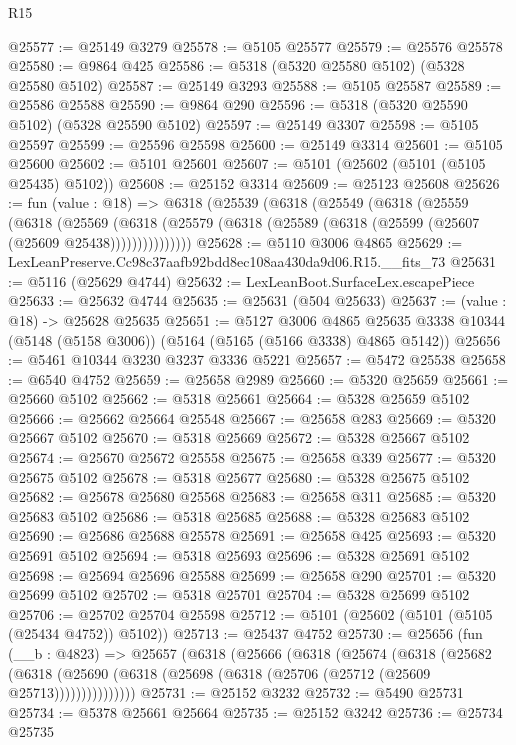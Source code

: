 \begin{lexlean}{R15}
\begin{coremodule}
{{{{{{{{{{{@25577 := @25149 @3279
@25578 := @5105 @25577
@25579 := @25576 @25578
@25580 := @9864 @425
@25586 := @5318 (@5320 @25580 @5102) (@5328 @25580 @5102)
@25587 := @25149 @3293
@25588 := @5105 @25587
@25589 := @25586 @25588
@25590 := @9864 @290
@25596 := @5318 (@5320 @25590 @5102) (@5328 @25590 @5102)
@25597 := @25149 @3307
@25598 := @5105 @25597
@25599 := @25596 @25598
@25600 := @25149 @3314
@25601 := @5105 @25600
@25602 := @5101 @25601
@25607 := @5101 (@25602 (@5101 (@5105 @25435) @5102))
@25608 := @25152 @3314
@25609 := @25123 @25608
@25626 := fun (value : @18) =>
  @6318
    (@25539
      (@6318
        (@25549
          (@6318
            (@25559
              (@6318
                (@25569
                  (@6318 (@25579 (@6318 (@25589 (@6318 (@25599 (@25607 (@25609 @25438)))))))))))))))
@25628 := @5110 @3006 @4865
@25629 := LexLeanPreserve.Cc98c37aafb92bdd8ec108aa430da9d06.R15.__fits_73
@25631 := @5116 (@25629 @4744)
@25632 := LexLeanBoot.SurfaceLex.escapePiece
@25633 := @25632 @4744
@25635 := @25631 (@504 @25633)
@25637 := (value : @18) -> @25628 @25635
@25651 := @5127
    @3006
    @4865
    @25635
    @3338
    @10344
    (@5148 (@5158 @3006))
    (@5164 (@5165 (@5166 @3338) @4865 @5142))
@25656 := @5461 @10344 @3230 @3237 @3336 @5221
@25657 := @5472 @25538
@25658 := @6540 @4752
@25659 := @25658 @2989
@25660 := @5320 @25659
@25661 := @25660 @5102
@25662 := @5318 @25661
@25664 := @5328 @25659 @5102
@25666 := @25662 @25664 @25548
@25667 := @25658 @283
@25669 := @5320 @25667 @5102
@25670 := @5318 @25669
@25672 := @5328 @25667 @5102
@25674 := @25670 @25672 @25558
@25675 := @25658 @339
@25677 := @5320 @25675 @5102
@25678 := @5318 @25677
@25680 := @5328 @25675 @5102
@25682 := @25678 @25680 @25568
@25683 := @25658 @311
@25685 := @5320 @25683 @5102
@25686 := @5318 @25685
@25688 := @5328 @25683 @5102
@25690 := @25686 @25688 @25578
@25691 := @25658 @425
@25693 := @5320 @25691 @5102
@25694 := @5318 @25693
@25696 := @5328 @25691 @5102
@25698 := @25694 @25696 @25588
@25699 := @25658 @290
@25701 := @5320 @25699 @5102
@25702 := @5318 @25701
@25704 := @5328 @25699 @5102
@25706 := @25702 @25704 @25598
@25712 := @5101 (@25602 (@5101 (@5105 (@25434 @4752)) @5102))
@25713 := @25437 @4752
@25730 := @25656
    (fun (__b : @4823) =>
    @25657
      (@6318
        (@25666
          (@6318
            (@25674
              (@6318
                (@25682
                  (@6318 (@25690 (@6318 (@25698 (@6318 (@25706 (@25712 (@25609 @25713)))))))))))))))
@25731 := @25152 @3232
@25732 := @5490 @25731
@25734 := @5378 @25661 @25664
@25735 := @25152 @3242
@25736 := @25734 @25735
}}}}}}}}}}}
\end{coremodule}
\end{lexlean}
